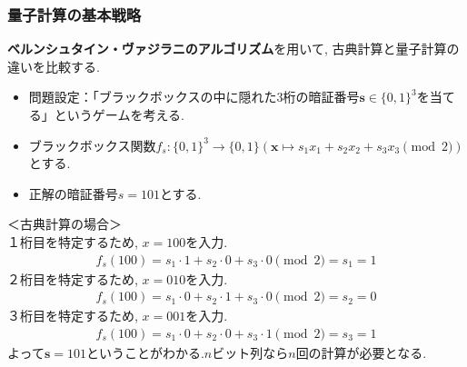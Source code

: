 \documentclass[9pt]{beamer}
\begin{document}
\begin{frame}
    \frametitle{量子計算の基本戦略}
    \textbf{ベルンシュタイン・ヴァジラニのアルゴリズム}を用いて, 古典計算と量子計算の違いを比較する.\\
    \begin{itemize}
        \item 問題設定：「ブラックボックスの中に隠れた3桁の暗証番号$\bm{s} \in \{0,1\}^3$を当てる」というゲームを考える.
        \item ブラックボックス関数$f_s \colon \{0, 1\}^3 \to \{0, 1\} \left( \bm{x} \mapsto s_1x_1 + s_2x_2 + s_3x_3 \pmod{2} \right)$とする.
        \item 正解の暗証番号$s = 101$とする.
    \end{itemize}
    ＜古典計算の場合＞\\
    １桁目を特定するため, $x = 100$を入力.
    \begin{align}
        f_s(100) = s_1\cdot1 + s_2\cdot0 + s_3\cdot0 \pmod{2} = s_1 = 1
    \end{align}
    ２桁目を特定するため, $x = 010$を入力.
    \begin{align}
        f_s(100) = s_1\cdot0 + s_2\cdot1 + s_3\cdot0 \pmod{2} = s_2 = 0
    \end{align}
    ３桁目を特定するため, $x = 001$を入力.
    \begin{align}
        f_s(100) = s_1\cdot0 + s_2\cdot0 + s_3\cdot1 \pmod{2} = s_3 = 1
    \end{align}
    よって$\bm{s} = 101$ということがわかる.$n$ビット列なら$n$回の計算が必要となる.
\end{frame}
\end{document}
